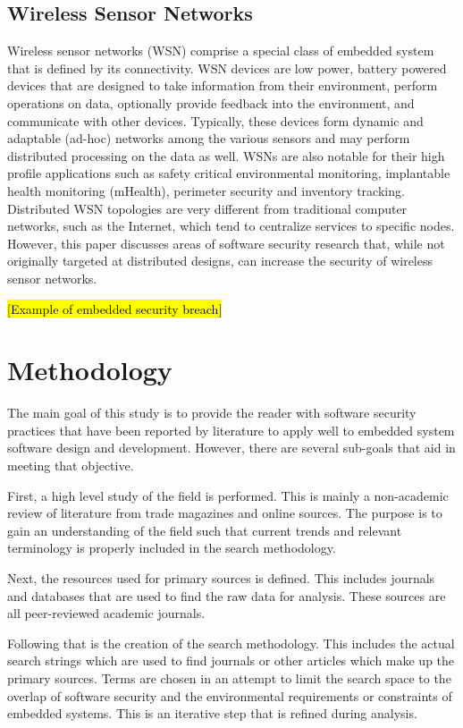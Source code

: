 \documentclass[final,conference,10pt]{IEEEtran}
\begin{document}
\subsection{Wireless Sensor Networks}

Wireless sensor networks (WSN) comprise a special class of embedded system that is defined by its connectivity.  WSN devices are low power, battery powered devices that are designed to take information from their environment, perform operations on data, optionally provide feedback into the environment, and communicate with other devices.  Typically, these devices form dynamic and adaptable (ad-hoc) networks among the various sensors and may perform distributed processing on the data as well.\cite{Singh2011}  WSNs are also notable for their high profile applications such as safety critical environmental monitoring, implantable health monitoring (mHealth), perimeter security and inventory tracking.\cite{Bojinov2010,Mahdavi-Hezavehi2013,Sahoo2012}  Distributed WSN topologies are very different from traditional computer networks, such as the Internet, which tend to centralize services to specific nodes. However, this paper discusses areas of software security research that, while not originally targeted at distributed designs, can increase the security of wireless sensor networks.

\hl{[Example of embedded security breach]}

\section{Methodology}
The main goal of this study is to provide the reader with software security practices that have been reported by literature to apply well to embedded system software design and development.  However, there are several sub-goals that aid in meeting that objective.  

First, a high level study of the field is performed.  This is mainly a non-academic review of literature from trade magazines and online sources. The purpose is to gain an understanding of the field such that current trends and relevant terminology is properly included in the search methodology.

Next, the resources used for primary sources is defined.  This includes journals and databases that are used to find the raw data for analysis.  These sources are all peer-reviewed academic journals.

Following that is the creation of the search methodology.  This includes the actual search strings which are used to find journals or other articles which make up the primary sources.  Terms are chosen in an attempt to limit the search space to the overlap of software security and the environmental requirements or constraints of embedded systems.  This is an iterative step that is refined during analysis.
\end{document}
